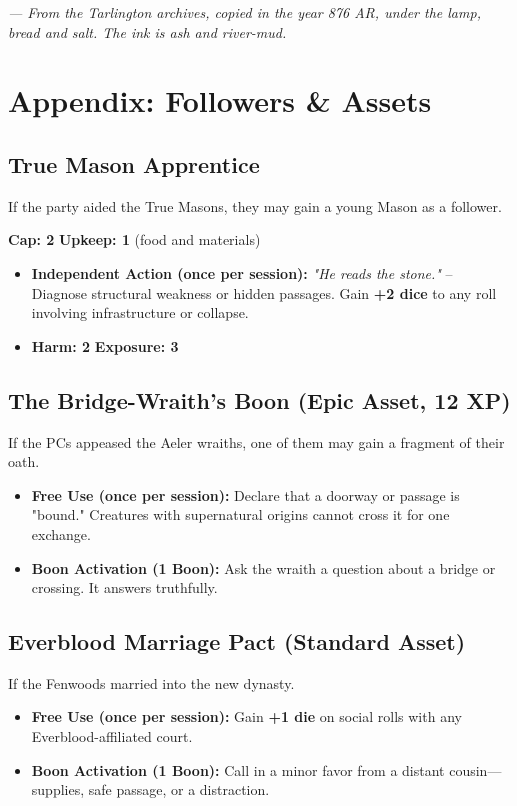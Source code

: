 \documentclass[11pt]{book}
\begin{document}
\vspace{2em}
\noindent\textit{--- From the Tarlington archives, copied in the year 876 AR, under the lamp, bread and salt. The ink is ash and river-mud.}

\clearpage

\chapter*{Appendix: Followers & Assets}

\section*{True Mason Apprentice}
If the party aided the True Masons, they may gain a young Mason as a follower.

\textbf{Cap: 2} \quad \textbf{Upkeep: 1} (food and materials)
\begin{itemize}
    \item \textbf{Independent Action (once per session):} \textit{"He reads the stone."} -- Diagnose structural weakness or hidden passages. Gain \textbf{+2 dice} to any roll involving infrastructure or collapse.
    \item \textbf{Harm: 2} \quad \textbf{Exposure: 3}
\end{itemize}

\section*{The Bridge-Wraith's Boon (Epic Asset, 12 XP)}
If the PCs appeased the Aeler wraiths, one of them may gain a fragment of their oath.
\begin{itemize}
    \item \textbf{Free Use (once per session):} Declare that a doorway or passage is "bound." Creatures with supernatural origins cannot cross it for one exchange.
    \item \textbf{Boon Activation (1 Boon):} Ask the wraith a question about a bridge or crossing. It answers truthfully.
\end{itemize}

\section*{Everblood Marriage Pact (Standard Asset)}
If the Fenwoods married into the new dynasty.
\begin{itemize}
    \item \textbf{Free Use (once per session):} Gain \textbf{+1 die} on social rolls with any Everblood-affiliated court.
    \item \textbf{Boon Activation (1 Boon):} Call in a minor favor from a distant cousin---supplies, safe passage, or a distraction.
\end{itemize}
\end{document}
